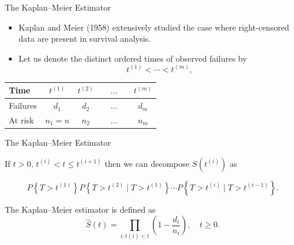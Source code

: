 \documentclass[12pt,t,handout]{beamer}
\begin{document}
\begin{frame}[c]{The Kaplan--Meier Estimator}

\begin{itemize}
  \itemsep12pt
  \item Kaplan and Meier (1958) extensively studied the case where
    right-censored data are present in survival analysis.
  \item Let us denote the distinct ordered times of observed failures by
    $$t^{(1)}<\cdots< t^{(m)},$$
\end{itemize}

\begin{center}
\begin{tabular}{ | l | c | c | c | c | }
  \hline
    Time & $t^{(1)}$  & $t^{(2)}$ & $\quad \ldots \quad$ & $t^{(m)}$ \\ \hline
    Failures & $d_1$ & $d_2$ & $\quad \ldots \quad$ & $d_{m}$ \\ \hline
    At risk & $n_1 = n$  & $n_2$ & $\quad \ldots \quad$ & $n_m$\\
  \hline
\end{tabular}
\end{center}
\note{
}

\end{frame}



\begin{frame}[c]{The Kaplan--Meier Estimator}

If $t>0$, $t^{(i)} <t \leq t^{(i+1)}$ then we can decompose $S(t^{(i)})$ as

$$ P\left\{T> t^{(1)}\right\}P\left\{T>t^{(2)} \mid T>t^{(1)}\right\}\cdots
P\left\{ T> t^{(i)} \mid T> t^{(i-1)} \right\}.$$

The Kaplan--Meier estimator is defined as
$$
\widehat{S}(t) = \prod_{i : t(i) < t} \left(1 - \frac{d_i}{n_i}\right), \quad
t\geq 0.
$$

\note{
}

\end{frame}

\end{document}
